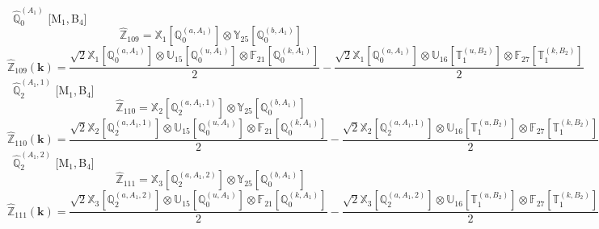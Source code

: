 \documentclass[fleqn,10pt,landscape]{article}
\begin{document}
\begin{itemize}
\begin{dmath*}
\end{dmath*}
\vspace{4mm}
\noindent {} $\,\,\,\hat{\mathbb{Q}}_{0}^{(A_{1})}$ [M$_{1}$,\,B$_{4}$]
\begin{dmath*}
\hat{\mathbb{Z}}_{109}=\mathbb{X}_{1}[\mathbb{Q}_{0}^{(a,A_{1})}] \otimes\mathbb{Y}_{25}[\mathbb{Q}_{0}^{(b,A_{1})}]
\end{dmath*}
\begin{dmath*}
\hat{\mathbb{Z}}_{109}(\bm{k})=\frac{\sqrt{2} \mathbb{X}_{1}[\mathbb{Q}_{0}^{(a,A_{1})}] \otimes\mathbb{U}_{15}[\mathbb{Q}_{0}^{(u,A_{1})}] \otimes\mathbb{F}_{21}[\mathbb{Q}_{0}^{(k,A_{1})}]}{2} - \frac{\sqrt{2} \mathbb{X}_{1}[\mathbb{Q}_{0}^{(a,A_{1})}] \otimes\mathbb{U}_{16}[\mathbb{T}_{1}^{(u,B_{2})}] \otimes\mathbb{F}_{27}[\mathbb{T}_{1}^{(k,B_{2})}]}{2}
\end{dmath*}
\vspace{4mm}
\noindent {} $\,\,\,\hat{\mathbb{Q}}_{2}^{(A_{1},1)}$ [M$_{1}$,\,B$_{4}$]
\begin{dmath*}
\hat{\mathbb{Z}}_{110}=\mathbb{X}_{2}[\mathbb{Q}_{2}^{(a,A_{1},1)}] \otimes\mathbb{Y}_{25}[\mathbb{Q}_{0}^{(b,A_{1})}]
\end{dmath*}
\begin{dmath*}
\hat{\mathbb{Z}}_{110}(\bm{k})=\frac{\sqrt{2} \mathbb{X}_{2}[\mathbb{Q}_{2}^{(a,A_{1},1)}] \otimes\mathbb{U}_{15}[\mathbb{Q}_{0}^{(u,A_{1})}] \otimes\mathbb{F}_{21}[\mathbb{Q}_{0}^{(k,A_{1})}]}{2} - \frac{\sqrt{2} \mathbb{X}_{2}[\mathbb{Q}_{2}^{(a,A_{1},1)}] \otimes\mathbb{U}_{16}[\mathbb{T}_{1}^{(u,B_{2})}] \otimes\mathbb{F}_{27}[\mathbb{T}_{1}^{(k,B_{2})}]}{2}
\end{dmath*}
\vspace{4mm}
\noindent {} $\,\,\,\hat{\mathbb{Q}}_{2}^{(A_{1},2)}$ [M$_{1}$,\,B$_{4}$]
\begin{dmath*}
\hat{\mathbb{Z}}_{111}=\mathbb{X}_{3}[\mathbb{Q}_{2}^{(a,A_{1},2)}] \otimes\mathbb{Y}_{25}[\mathbb{Q}_{0}^{(b,A_{1})}]
\end{dmath*}
\begin{dmath*}
\hat{\mathbb{Z}}_{111}(\bm{k})=\frac{\sqrt{2} \mathbb{X}_{3}[\mathbb{Q}_{2}^{(a,A_{1},2)}] \otimes\mathbb{U}_{15}[\mathbb{Q}_{0}^{(u,A_{1})}] \otimes\mathbb{F}_{21}[\mathbb{Q}_{0}^{(k,A_{1})}]}{2} - \frac{\sqrt{2} \mathbb{X}_{3}[\mathbb{Q}_{2}^{(a,A_{1},2)}] \otimes\mathbb{U}_{16}[\mathbb{T}_{1}^{(u,B_{2})}] \otimes\mathbb{F}_{27}[\mathbb{T}_{1}^{(k,B_{2})}]}{2}
\end{dmath*}
\vspace{4mm}

\end{itemize}
\end{document}
